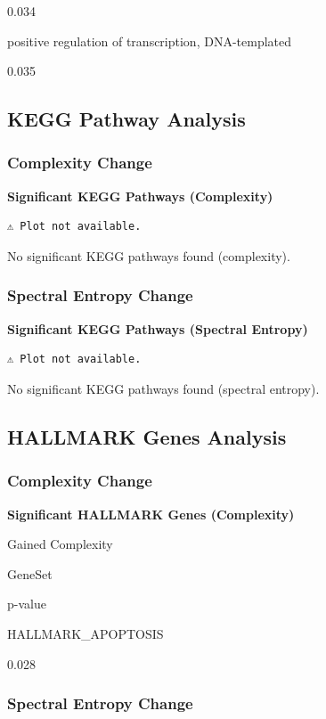 \documentclass[
  letterpaper,
  DIV=11,
  numbers=noendperiod,
  openany,
  oneside]{scrreprt}
\begin{document}
0.034

positive regulation of transcription, DNA-templated

0.035

\subsection{KEGG Pathway Analysis}

\subsubsection{Complexity Change}

\textbf{Significant KEGG Pathways (Complexity)}

\begin{verbatim}
⚠️ Plot not available.
\end{verbatim}

No significant KEGG pathways found (complexity).

\subsubsection{Spectral Entropy Change}

\textbf{Significant KEGG Pathways (Spectral Entropy)}

\begin{verbatim}
⚠️ Plot not available.
\end{verbatim}

No significant KEGG pathways found (spectral entropy).

\subsection{HALLMARK Genes Analysis}

\subsubsection{Complexity Change}

\textbf{Significant HALLMARK Genes (Complexity)}

Gained Complexity

GeneSet

p-value

HALLMARK\_APOPTOSIS

0.028

\subsubsection{Spectral Entropy Change}
\end{document}
